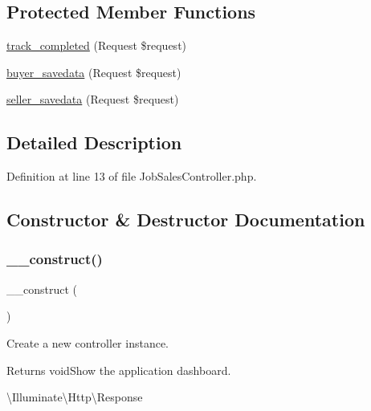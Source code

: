 \subsection*{Protected Member Functions}
\begin{DoxyCompactItemize}
\item 
\mbox{\hyperlink{class_responsive_1_1_http_1_1_controllers_1_1_job_sales_controller_a0a382fbac6510344a738649ecb2dda95}{track\+\_\+completed}} (Request \$request)
\item 
\mbox{\hyperlink{class_responsive_1_1_http_1_1_controllers_1_1_job_sales_controller_acaa311945d5dcb4df3f670f1a719cae7}{buyer\+\_\+savedata}} (Request \$request)
\item 
\mbox{\hyperlink{class_responsive_1_1_http_1_1_controllers_1_1_job_sales_controller_ae2dccfe17cdf0cf730208fd33a019c6f}{seller\+\_\+savedata}} (Request \$request)
\end{DoxyCompactItemize}


\subsection{Detailed Description}


Definition at line 13 of file Job\+Sales\+Controller.\+php.



\subsection{Constructor \& Destructor Documentation}
\mbox{\label{class_responsive_1_1_http_1_1_controllers_1_1_job_sales_controller_a095c5d389db211932136b53f25f39685}} 
\subsubsection{\texorpdfstring{\_\_construct()}{\_\_construct()}}
{\footnotesize\ttfamily \+\_\+\+\_\+construct (\begin{DoxyParamCaption}{ }\end{DoxyParamCaption})}

Create a new controller instance.

\begin{DoxyReturn}{Returns}
void\+Show the application dashboard.

\textbackslash{}\+Illuminate\textbackslash{}\+Http\textbackslash{}\+Response 
\end{DoxyReturn}


